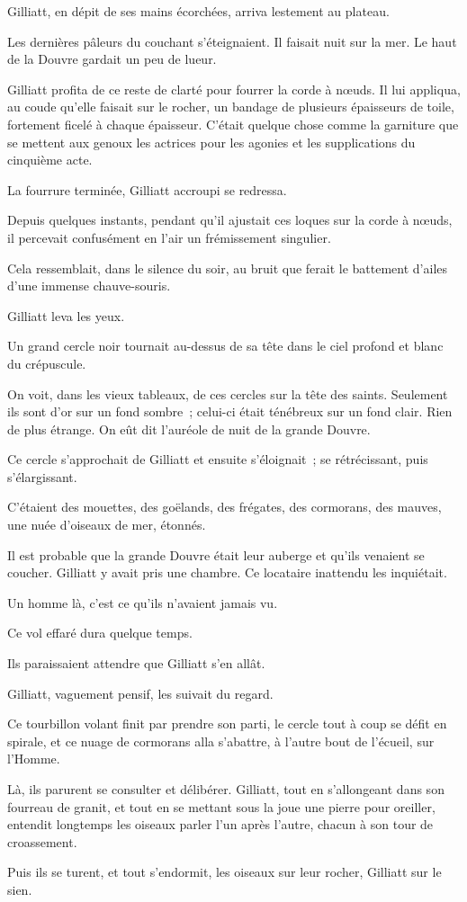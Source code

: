 \documentclass[french,twoside]{book} %
\begin{document}
Gilliatt, en dépit de ses mains écorchées, arriva lestement au plateau.\par
Les dernières pâleurs du couchant s’éteignaient. Il faisait nuit sur la mer. Le haut de la Douvre gardait un peu de lueur.\par
Gilliatt profita de ce reste de clarté pour fourrer la corde à nœuds. Il lui appliqua, au coude qu’elle faisait sur le rocher, un bandage de plusieurs épaisseurs de toile, fortement ficelé à chaque épaisseur. C’était quelque chose comme la garniture que se mettent aux genoux les actrices pour les agonies et les supplications du cinquième acte.\par
La fourrure terminée, Gilliatt accroupi se redressa.\par
Depuis quelques instants, pendant qu’il ajustait ces loques sur la corde à nœuds, il percevait confusément en l’air un frémissement singulier.\par
Cela ressemblait, dans le silence du soir, au bruit que ferait le battement d’ailes d’une immense chauve-souris.\par
Gilliatt leva les yeux.\par
 Un grand cercle noir tournait au-dessus de sa tête dans le ciel profond et blanc du crépuscule.\par
On voit, dans les vieux tableaux, de ces cercles sur la tête des saints. Seulement ils sont d’or sur un fond sombre ; celui-ci était ténébreux sur un fond clair. Rien de plus étrange. On eût dit l’auréole de nuit de la grande Douvre.\par
Ce cercle s’approchait de Gilliatt et ensuite s’éloignait ; se rétrécissant, puis s’élargissant.\par
C’étaient des mouettes, des goëlands, des frégates, des cormorans, des mauves, une nuée d’oiseaux de mer, étonnés.\par
Il est probable que la grande Douvre était leur auberge et qu’ils venaient se coucher. Gilliatt y avait pris une chambre. Ce locataire inattendu les inquiétait.\par
Un homme là, c’est ce qu’ils n’avaient jamais vu.\par
Ce vol effaré dura quelque temps.\par
Ils paraissaient attendre que Gilliatt s’en allât.\par
Gilliatt, vaguement pensif, les suivait du regard.\par
Ce tourbillon volant finit par prendre son parti, le cercle tout à coup se défit en spirale, et ce nuage de cormorans alla s’abattre, à l’autre bout de l’écueil, sur l’Homme.\par
Là, ils parurent se consulter et délibérer. Gilliatt, tout en s’allongeant dans son fourreau de granit, et tout en se mettant sous la joue une pierre pour oreiller, entendit longtemps les oiseaux parler l’un après l’autre, chacun à son tour de croassement.\par
Puis ils se turent, et tout s’endormit, les oiseaux sur leur rocher, Gilliatt sur le sien.
\end{document}
